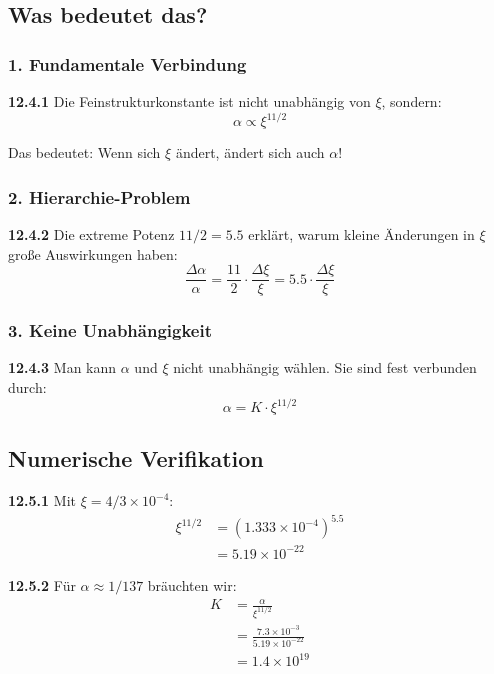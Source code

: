 \subsection{Was bedeutet das?}

\subsubsection{1. Fundamentale Verbindung}
\noindent \textbf{12.4.1} Die Feinstrukturkonstante ist nicht unabhängig von $\xi$, sondern:
\begin{equation}
	\alpha \propto \xi^{11/2}
\end{equation}

Das bedeutet: Wenn sich $\xi$ ändert, ändert sich auch $\alpha$!

\subsubsection{2. Hierarchie-Problem}
\noindent \textbf{12.4.2} Die extreme Potenz $11/2 = 5.5$ erklärt, warum kleine Änderungen in $\xi$ große Auswirkungen haben:
\begin{equation}
	\frac{\Delta \alpha}{\alpha} = \frac{11}{2} \cdot \frac{\Delta \xi}{\xi} = 5.5 \cdot \frac{\Delta \xi}{\xi}
\end{equation}

\subsubsection{3. Keine Unabhängigkeit}
\noindent \textbf{12.4.3} Man kann $\alpha$ und $\xi$ nicht unabhängig wählen. Sie sind fest verbunden durch:
\begin{equation}
	\alpha = K \cdot \xi^{11/2}
\end{equation}

\subsection{Numerische Verifikation}

\noindent \textbf{12.5.1} Mit $\xi = 4/3 \times 10^{-4}$:
\begin{align}
	\xi^{11/2} &= (1.333 \times 10^{-4})^{5.5} \\
	&= 5.19 \times 10^{-22}
\end{align}

\noindent \textbf{12.5.2} Für $\alpha \approx 1/137$ bräuchten wir:
\begin{align}
	K &= \frac{\alpha}{\xi^{11/2}} \\
	&= \frac{7.3 \times 10^{-3}}{5.19 \times 10^{-22}} \\
	&= 1.4 \times 10^{19}
\end{align}

